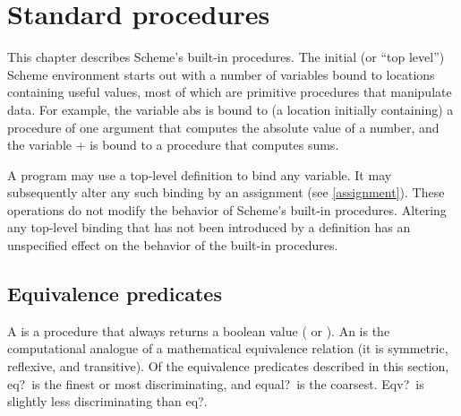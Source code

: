 
\chapter{Standard procedures}
\label{initialenv}
\label{builtinchapter}


This chapter describes Scheme's built-in procedures.  The initial (or
``top level'') Scheme environment starts out with a number of variables
bound to locations containing useful values, most of which are primitive
procedures that manipulate data.  For example, the variable {\cf abs} is
bound to (a location initially containing) a procedure of one argument
that computes the absolute value of a number, and the variable {\cf +}
is bound to a procedure that computes sums.  

A program may use a top-level definition to bind any variable.  It may
subsequently alter any such binding by an assignment (see \ref{assignment}).
These operations do not modify the behavior of Scheme's built-in
procedures.  Altering any top-level binding that has not been introduced by a
definition has an unspecified effect on the behavior of the built-in procedures.

\section{Equivalence predicates}
\label{equivalencesection}

A  is a procedure that always returns a boolean
value (\schtrue{} or \schfalse).  An  is
the computational analogue of a mathematical equivalence relation (it is
symmetric, reflexive, and transitive).  Of the equivalence predicates
described in this section, {\cf eq?}\ is the finest or most
discriminating, and {\cf equal?}\ is the coarsest.  {\cf Eqv?}\ is
slightly less discriminating than {\cf eq?}.  


